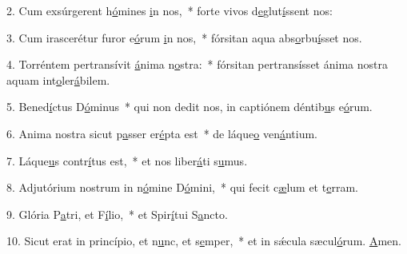 2. Cum exsúrgerent h\uline{ó}mines \uline{i}n nos,~* forte vivos d\uline{e}glut\uline{í}ssent nos:\par 
3. Cum irascerétur furor e\uline{ó}rum \uline{i}n nos,~* fórsitan aqua abs\uline{o}rbu\uline{í}sset nos.\par 
4. Torréntem pertransívit \uline{á}nima n\uline{o}stra:~* fórsitan pertransísset ánima nostra aquam int\uline{o}ler\uline{á}bilem.\par 
5. Bened\uline{í}ctus D\uline{ó}minus~* qui non dedit nos, in captiónem déntib\uline{u}s e\uline{ó}rum.\par 
6. Anima nostra sicut p\uline{a}sser er\uline{é}pta est~* de láque\uline{o} ven\uline{á}ntium.\par 
7. Láque\uline{u}s contr\uline{í}tus est,~* et nos liber\uline{á}ti s\uline{u}mus.\par 
8. Adjutórium nostrum in n\uline{ó}mine D\uline{ó}mini,~* qui fecit c\uline{æ}lum et t\uline{e}rram.\par 
9. Glória P\uline{a}tri, et F\uline{í}lio,~* et Spir\uline{í}tui S\uline{a}ncto.\par 
10. Sicut erat in princípio, et n\uline{u}nc, et s\uline{e}mper,~* et in sǽcula sæcul\uline{ó}rum. \uline{A}men.\par 
